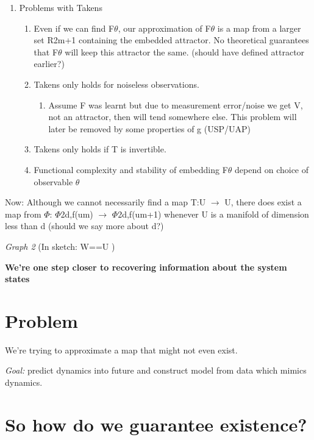 \documentclass[12pt, oneside]{article}
\theoremstyle{definition}
\begin{document}
\begin{enumerate}
\begin{enumerate}
  \end{enumerate}
  \item Problems with Takens
  \begin{enumerate}
    \item Even if we can find F$\theta$, our approximation of F$\theta$ is a map from a larger set R2m+1
    containing the embedded attractor. No theoretical guarantees that F$\theta$ will keep
    this attractor the same. (should have defined attractor earlier?)
    \item Takens only holds for noiseless observations.
        \begin{enumerate}
          \item Assume F was learnt but due to measurement error/noise we get V, not an attractor, then will tend somewhere else. This problem will later be removed by some properties of g (USP/UAP)
        \end{enumerate}
    \item Takens only holds if T is invertible. 
    \item  Functional complexity and stability of embedding F$\theta$ depend on choice of  observable $\theta$
  \end{enumerate}
\end{enumerate}


Now: Although we cannot necessarily find a map T:U $\rightarrow$ U, there does exist a map from
$\Phi$: $\Phi$2d,f(um) $\rightarrow$ $\Phi$2d,f(um+1) whenever U is a manifold of dimension less than d (should we say more
about d?)

\emph{Graph 2}
(In sketch: W==U )

\textbf{We’re one step closer to recovering information about the system states}



\section{Problem}

We're trying to approximate a map that might not even exist.


\emph{Goal:} 
predict dynamics into future and construct model from data which mimics dynamics.


\section{So how do we guarantee existence?}
\end{document}
